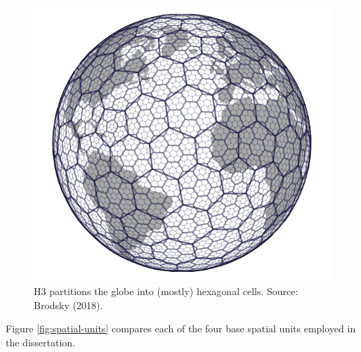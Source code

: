 \documentclass[a4paper, nobind]{templates/ociamthesis}
\begin{document}
\begin{figure}

{\centering \includegraphics[width=0.65\linewidth]{figures/h3-globe} 

}

\caption[H3 partitions the globe into hexagonal cells.]{H3 partitions the globe into (mostly) hexagonal cells. Source: Brodsky (2018).}\label{fig:h3-globe}
\end{figure}

Figure \ref{fig:spatial-units} compares each of the four base spatial units employed in the dissertation.
\end{document}
